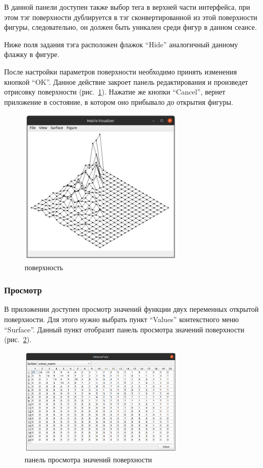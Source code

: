 \documentclass[12pt, a4paper, hidelinks]{article}
\begin{document}
В данной панели доступен также выбор тега в верхней части интерфейса, при этом тэг поверхности дублируется в тэг сконвертированной из этой поверхности фигуры, следовательно, он должен быть уникален среди фигур в данном сеансе.

Ниже поля задания тэга расположен флажок \enquote{Hide} аналогичный данному флажку в фигуре.

После настройки параметров поверхности необходимо принять изменения кнопкой \enquote{OK}. Данное действие закроет панель редактирования и произведет отрисовку поверхности (рис.~\ref{surface}). Нажатие же кнопки \enquote{Cancel}, вернет приложение в состояние, в котором оно прибывало до открытия фигуры.

\begin{figure}[htbp!]
	\centering
	\includegraphics[width=0.7\textwidth]{images/surfaceopened.png}
	\caption{поверхность}
	\label{surface}
\end{figure}

\subsubsection{Просмотр}
В приложении доступен просмотр значений функции двух переменных открытой поверхности. Для этого нужно выбрать пункт \enquote{Values} контекстного меню \enquote{Surface}. Данный пункт отобразит панель просмотра значений поверхности (рис.~\ref{surface_view}).

\begin{figure}[htbp!]
	\centering
	\includegraphics[width=0.7\textwidth]{images/surfaceview.png}
	\caption{панель просмотра значений поверхности}
	\label{surface_view}
\end{figure}
\end{document}
